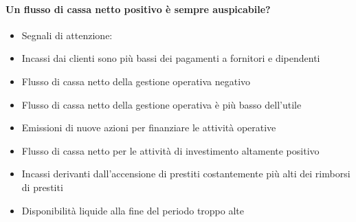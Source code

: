 \documentclass[10pt,a4paper,fleqn,oneside]{book}
\begin{document}
\paragraph{Un flusso di cassa netto positivo è sempre auspicabile?}
\begin{itemize}
    \item Segnali di attenzione:
    \item Incassi dai clienti sono più bassi dei pagamenti a fornitori e dipendenti
    \item Flusso di cassa netto della gestione operativa negativo
    \item Flusso di cassa netto della gestione operativa è più basso dell’utile
    \item Emissioni di nuove azioni per finanziare le attività operative
    \item Flusso di cassa netto per le attività di investimento altamente positivo
    \item Incassi derivanti dall’accensione di prestiti costantemente più alti dei
    rimborsi di prestiti
    \item Disponibilità liquide alla fine del periodo troppo alte
\end{itemize}



\end{document}
